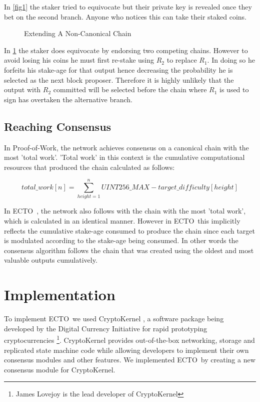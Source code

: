 \documentclass{article}
\newcommand{\coin}{ \textsc{ECTO}\ }
\begin{document}
In \ref{fig1} the staker tried to equivocate but their private key is revealed once they bet on the second branch. Anyone who notices this can take their staked coins.

\begin{figure}[!h]
	\caption{Extending A Non-Canonical Chain}
	\label{fig2}
	\centering
{}
\end{figure}
 
 In \ref{fig2} the staker does equivocate by endorsing two competing chains. However to avoid losing his coins he must first re-stake using $ R_2 $ to replace $ R_1 $. In doing so he forfeits his stake-age for that output hence decreasing the probability he is selected as the next block proposer. Therefore it is highly unlikely that the output with $ R_2 $ committed will be selected before the chain where $ R_1 $ is used to sign has overtaken the alternative branch.
 
\subsection{Reaching Consensus}
In Proof-of-Work, the network achieves consensus on a canonical chain with the most 'total work'. 'Total work' in this context is the cumulative computational resources that produced the chain calculated as follows:

$$ total\_work[n] = \sum_{height=1}^{n} UINT256\_MAX - target\_difficulty[height] $$

In \coin, the network also follows with the chain with the most 'total work', which is calculated in an identical manner. However in \coin this implicitly reflects the cumulative stake-age consumed to produce the chain since each target is modulated according to the stake-age being consumed. In other words the consensus algorithm follows the chain that was created using the oldest and most valuable outputs cumulatively.  


\section{Implementation}
To implement \coin we used CryptoKernel \cite{ck}, a software package being developed by the Digital Currency Initiative for rapid prototyping cryptocurrencies \footnote{James Lovejoy is the lead developer of CryptoKernel}. CryptoKernel provides out-of-the-box networking, storage and replicated state machine code while allowing developers to implement their own consensus modules and other features. We implemented \coin by creating a new consensus module for CryptoKernel.
\end{document}
